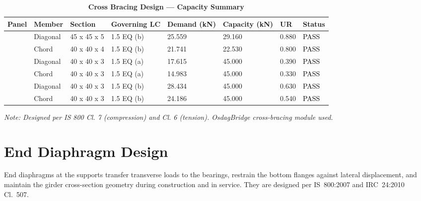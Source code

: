 \documentclass[12pt,a4paper]{report}
\numberwithin{table}{chapter}
\numberwithin{figure}{chapter}
\begin{document}
\vspace{1em}
\begin{longtable}{|C{2.0cm}|L{1.8cm}|C{2.2cm}|C{3.0cm}|C{1.8cm}|C{1.8cm}|C{1.2cm}|C{1.8cm}|}
\caption{\textbf{Cross Bracing Design --- Capacity Summary}}
\hline
\textbf{Panel} & \textbf{Member} & \textbf{Section} & \textbf{Governing LC} & \textbf{Demand (kN)} & \textbf{Capacity (kN)} & \textbf{UR} & \textbf{Status} \\[6pt]
\hline
{} & Diagonal & 45 x 45 x 5 & 1.5 EQ (b) & 25.559 & 29.160 & 0.880 & \textcolor{black}{PASS} \\[6pt]
 & Chord & 40 x 40 x 4 & 1.5 EQ (b) & 21.741 & 22.530 & 0.800 & \textcolor{black}{PASS} \\[6pt]
\hline
{} & Diagonal & 40 x 40 x 3 & 1.5 EQ (a) & 17.615 & 45.000 & 0.390 & \textcolor{black}{PASS} \\[6pt]
 & Chord & 40 x 40 x 3 & 1.5 EQ (a) & 14.983 & 45.000 & 0.330 & \textcolor{black}{PASS} \\[6pt]
\hline
{} & Diagonal & 40 x 40 x 3 & 1.5 EQ (b) & 28.434 & 45.000 & 0.630 & \textcolor{black}{PASS} \\[6pt]
 & Chord & 40 x 40 x 3 & 1.5 EQ (b) & 24.186 & 45.000 & 0.540 & \textcolor{black}{PASS} \\[6pt]
\hline
\end{longtable}
\noindent\textit{Note: Designed per IS 800 Cl. 7 (compression) and Cl. 6 (tension). OsdagBridge cross-bracing module used.}

\section{End Diaphragm Design}
\label{sec:end-diaphragm}

End diaphragms at the supports transfer transverse loads to the bearings, restrain the bottom flanges against lateral displacement, and maintain the girder cross-section geometry during construction and in service. They are designed per IS~800:2007 and IRC~24:2010 Cl.~507.

\vspace{1em}

\vspace{0.4em}
\noindent
\setlength{\tabcolsep}{4pt}
\setlength{\LTleft}{0pt}
\setlength{\LTright}{\fill}
\end{document}
